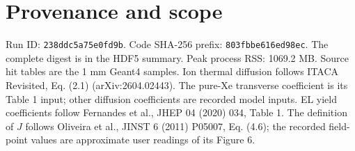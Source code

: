 \documentclass[11pt]{article}
\begin{document}
\section*{Provenance and scope}
Run ID: \texttt{238ddc5a75e0fd9b}. Code SHA-256 prefix: \texttt{803fbbe616ed98ec}. The complete digest is in the HDF5 summary.
Peak process RSS: 1069.2 MB. Source hit tables are the 1 mm Geant4 samples.
Ion thermal diffusion follows ITACA Revisited, Eq. (2.1) (arXiv:2604.02443). The pure-Xe transverse coefficient is its Table 1 input; other diffusion coefficients are recorded model inputs. EL yield coefficients follow Fernandes et al., JHEP 04 (2020) 034, Table 1. The definition of $J$ follows Oliveira et al., JINST 6 (2011) P05007, Eq. (4.6); the recorded field-point values are approximate user readings of its Figure 6.
\end{document}
